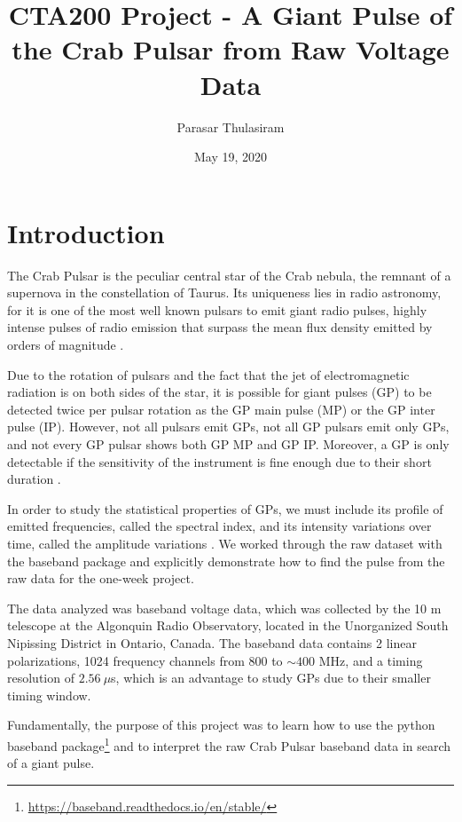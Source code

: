 \documentclass{article}
\title{CTA200 Project - A Giant Pulse of the Crab Pulsar from Raw Voltage Data}
\author{Parasar Thulasiram}
\date{May 19, 2020}
\begin{document}
\maketitle

\section{Introduction}
The Crab Pulsar is the peculiar central star of the Crab nebula, the remnant of a supernova in the constellation of Taurus. Its uniqueness lies in radio astronomy, for it is one of the most well known pulsars to emit giant radio pulses, 
highly intense pulses of radio emission that surpass the mean flux density emitted by orders of magnitude \cite{2019MNRAS.490L..12B}.

Due to the rotation of pulsars and the fact that the jet of electromagnetic radiation is on both sides of the star, it is possible for giant pulses (GP)
to be detected twice per pulsar rotation as the GP main pulse (MP) 
or the GP inter pulse (IP). 
However, not all pulsars emit GPs, not all GP pulsars emit only GPs, and not every GP pulsar shows both GP MP
and GP IP. Moreover, a GP is only detectable if the sensitivity of the instrument is fine enough due to their short duration
 \cite{2012hpa..book.....L}.

In order to study the statistical properties of GPs, we must include its profile of emitted frequencies, called the spectral index, and its intensity variations over time, called the amplitude variations \cite{2019MNRAS.490L..12B}. We worked through the raw dataset with the baseband package and explicitly demonstrate how to find the pulse from the raw data for the one-week project.

The data analyzed was baseband voltage data, which was collected by the 10 m telescope at the Algonquin Radio Observatory, located in the Unorganized South Nipissing District in Ontario, Canada. The baseband data contains 2 linear polarizations, 1024 frequency channels from 800 to $\sim 400$ MHz, and a timing resolution of $2.56 \ \mu$s, which is an advantage to study GPs due to their smaller timing window.

Fundamentally, the purpose of this project was to learn how to use the python baseband package\footnote{\url{https://baseband.readthedocs.io/en/stable/}} and to interpret the raw Crab Pulsar baseband data in search of a giant pulse.  
\end{document}
